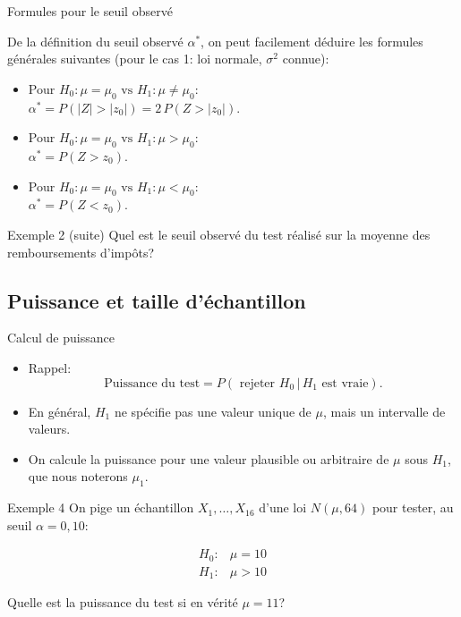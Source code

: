\documentclass{BeamerTemplate}
\begin{document}
\begin{frame}[t]{Formules pour le seuil observé}

 {\small
 De la définition du seuil observé $\alpha^*$, on peut facilement déduire
les formules générales suivantes (pour le cas 1: loi normale, $\sigma^2$ connue):

 \begin{itemize}\itemsep4mm
 \item Pour $H_0 : \mu = \mu_0 \mbox{ vs } H_1 : \mu \neq \mu_0$:\\
 $\alpha^*=P(|Z|>|z_{0}|)=2\,P(Z>|z_{0}|)$.
 \item Pour $H_0 : \mu = \mu_0 \mbox{ vs } H_1 : \mu > \mu_0$:\\
 $\alpha^*=P(Z>z_{0})$.
 \item Pour $H_0 : \mu = \mu_0 \mbox{ vs } H_1 : \mu < \mu_0$:\\
 $\alpha^*=P(Z<z_{0})$.
 \end{itemize}
 }
\end{frame}

\begin{frame}[t]{Exemple 2 (suite)}
Quel est le seuil observé du test réalisé sur la moyenne des remboursements d'impôts?
{\ }
\end{frame}



\subsection{Puissance et taille d'échantillon}

\begin{frame}[t]{Calcul de puissance}

\begin{itemize}\itemsep7mm
\item Rappel: $$\text{Puissance du test}=P(\text{ rejeter } H_0\,|\,H_1 \text{  est vraie}).$$
\item En général, $H_1$ ne spécifie pas une valeur unique de $\mu$, mais un intervalle de valeurs.
\item On calcule la puissance pour une valeur plausible ou arbitraire de $\mu$ sous $H_1$, que nous noterons $\mu_1$.
\end{itemize}
\end{frame}

\begin{frame}[t]{Exemple 4}
On pige un échantillon $X_1, \ldots, X_{16}$  d'une loi $N(\mu, 64)$ pour tester, au seuil $\alpha = 0,10$:

 $$\begin{array}{ll}
 H_0 : &\mu = 10\\ H_1 : &\mu > 10
 \end{array}$$

 Quelle est la puissance du test si en vérité $\mu = 11$?
\end{frame}
\end{document}
